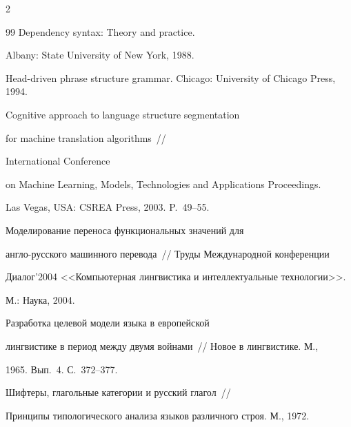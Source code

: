 \begin{multicols}{2}
{{\begin{thebibliography}{99}
Dependency syntax: Theory and practice.


Albany: State University of New York, 1988.









Head-driven phrase structure grammar. Chicago: University of Chicago Press, 1994.









Cognitive approach to language structure segmentation


for machine translation algorithms~//


International Conference


on Machine Learning, Models, Technologies and Applications Proceedings.


Las Vegas, USA: CSREA Press, 2003. P.~49--55.









Моделирование переноса функциональных значений для


англо-русского машинного перевода~// Труды Международной конференции


Диалог'2004 <<Компьютерная лингвистика и интеллектуальные технологии>>.


М.: Наука, 2004.









Разработка целевой модели языка в европейской


лингвистике в период между двумя войнами~// Новое в лингвистике. М.,


1965. Вып.~4. С.~372--377.









Шифтеры, глагольные категории и русский глагол~//


Принципы типологического анализа языков различного строя. М., 1972.






\end{thebibliography}}}
\end{multicols}
